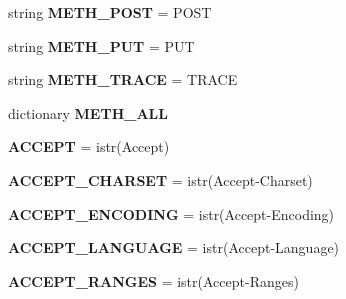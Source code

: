\begin{DoxyCompactItemize}
\item 
\mbox{\label{namespaceaiohttp_1_1hdrs_ad39dce8f0f0cba31d7aaf2ca025c8812}} 
string {\bfseries M\+E\+T\+H\+\_\+\+P\+O\+ST} = \textquotesingle{}P\+O\+ST\textquotesingle{}
\item 
\mbox{\label{namespaceaiohttp_1_1hdrs_a1ef871727addb3e1c45f687d3e8e6799}} 
string {\bfseries M\+E\+T\+H\+\_\+\+P\+UT} = \textquotesingle{}P\+UT\textquotesingle{}
\item 
\mbox{\label{namespaceaiohttp_1_1hdrs_a9ced5cd3962b988b66bb250f5ff77a1a}} 
string {\bfseries M\+E\+T\+H\+\_\+\+T\+R\+A\+CE} = \textquotesingle{}T\+R\+A\+CE\textquotesingle{}
\item 
dictionary {\bfseries M\+E\+T\+H\+\_\+\+A\+LL}
\item 
\mbox{\label{namespaceaiohttp_1_1hdrs_a905044b1c61807c7fd41c733847fe9ab}} 
{\bfseries A\+C\+C\+E\+PT} = istr(\textquotesingle{}Accept\textquotesingle{})
\item 
\mbox{\label{namespaceaiohttp_1_1hdrs_a6693d6346e76547cee7b967946a065bb}} 
{\bfseries A\+C\+C\+E\+P\+T\+\_\+\+C\+H\+A\+R\+S\+ET} = istr(\textquotesingle{}Accept-\/Charset\textquotesingle{})
\item 
\mbox{\label{namespaceaiohttp_1_1hdrs_a1095c7eb103a9ec29b7f50d7db1ede70}} 
{\bfseries A\+C\+C\+E\+P\+T\+\_\+\+E\+N\+C\+O\+D\+I\+NG} = istr(\textquotesingle{}Accept-\/Encoding\textquotesingle{})
\item 
\mbox{\label{namespaceaiohttp_1_1hdrs_a7ab7c72ebfb32363831c15b97da9ad29}} 
{\bfseries A\+C\+C\+E\+P\+T\+\_\+\+L\+A\+N\+G\+U\+A\+GE} = istr(\textquotesingle{}Accept-\/Language\textquotesingle{})
\item 
\mbox{\label{namespaceaiohttp_1_1hdrs_ae1be937efc4bf840bf026487d377434f}} 
{\bfseries A\+C\+C\+E\+P\+T\+\_\+\+R\+A\+N\+G\+ES} = istr(\textquotesingle{}Accept-\/Ranges\textquotesingle{})
\item 
\mbox{\label{namespaceaiohttp_1_1hdrs_a20c42026faf1abfe1956fafd85e711e9}} 

\end{DoxyCompactItemize}
